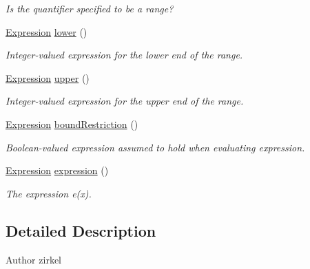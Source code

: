 \begin{DoxyCompactItemize}
\begin{DoxyCompactList}\small\item\em Is the quantifier specified to be a range? \end{DoxyCompactList}\item 
\hyperlink{interfaceedu_1_1udel_1_1cis_1_1vsl_1_1civl_1_1model_1_1IF_1_1expression_1_1Expression}{Expression} \hyperlink{interfaceedu_1_1udel_1_1cis_1_1vsl_1_1civl_1_1model_1_1IF_1_1expression_1_1QuantifiedExpression_a0160fd56ba93ba3db7db0d13e33c47b1}{lower} ()
\begin{DoxyCompactList}\small\item\em Integer-\/valued expression for the lower end of the range. \end{DoxyCompactList}\item 
\hyperlink{interfaceedu_1_1udel_1_1cis_1_1vsl_1_1civl_1_1model_1_1IF_1_1expression_1_1Expression}{Expression} \hyperlink{interfaceedu_1_1udel_1_1cis_1_1vsl_1_1civl_1_1model_1_1IF_1_1expression_1_1QuantifiedExpression_acf0d2706c091f8f431cde30949772022}{upper} ()
\begin{DoxyCompactList}\small\item\em Integer-\/valued expression for the upper end of the range. \end{DoxyCompactList}\item 
\hyperlink{interfaceedu_1_1udel_1_1cis_1_1vsl_1_1civl_1_1model_1_1IF_1_1expression_1_1Expression}{Expression} \hyperlink{interfaceedu_1_1udel_1_1cis_1_1vsl_1_1civl_1_1model_1_1IF_1_1expression_1_1QuantifiedExpression_ae736822ef6856aecf94e5b1d4c534641}{bound\+Restriction} ()
\begin{DoxyCompactList}\small\item\em Boolean-\/valued expression assumed to hold when evaluating expression. \end{DoxyCompactList}\item 
\hyperlink{interfaceedu_1_1udel_1_1cis_1_1vsl_1_1civl_1_1model_1_1IF_1_1expression_1_1Expression}{Expression} \hyperlink{interfaceedu_1_1udel_1_1cis_1_1vsl_1_1civl_1_1model_1_1IF_1_1expression_1_1QuantifiedExpression_a6585cf434492893cc6cde9a64036dc22}{expression} ()
\begin{DoxyCompactList}\small\item\em The expression e(x). \end{DoxyCompactList}\end{DoxyCompactItemize}


\subsection{Detailed Description}
\begin{DoxyAuthor}{Author}
zirkel 
\end{DoxyAuthor}


